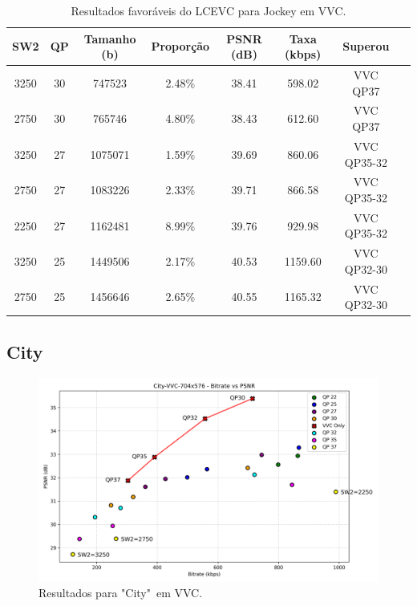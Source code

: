 \begin{table}[h]
    \centering
    \label{tab:jockey-vvc-lcevc}
    \begin{tabular}{|c|c|c|c|c|c|c|c|}
        \hline
        \textbf{SW2} & \textbf{QP} & \textbf{Tamanho (b)} & \textbf{Proporção} & \textbf{PSNR (dB)} & \textbf{Taxa (kbps)} & \textbf{Superou} \\
        \hline
        3250 & 30 & 747523 & 2.48\% & 38.41 & 598.02 & VVC QP37 \\
        2750 & 30 & 765746 & 4.80\% & 38.43 & 612.60 & VVC QP37 \\
        3250 & 27 & 1075071 & 1.59\% & 39.69 & 860.06 & VVC QP35-32 \\
        2750 & 27 & 1083226 & 2.33\% & 39.71 & 866.58 & VVC QP35-32 \\
        2250 & 27 & 1162481 & 8.99\% & 39.76 & 929.98 & VVC QP35-32 \\
        3250 & 25 & 1449506 & 2.17\% & 40.53 & 1159.60 & VVC QP32-30 \\
        2750 & 25 & 1456646 & 2.65\% & 40.55 & 1165.32 & VVC QP32-30 \\
        \hline
    \end{tabular}
    \caption{Resultados favoráveis do LCEVC para Jockey em VVC.}
\end{table}

\newpage
\subsection{City}

\begin{figure}[h]
    \centering
    \includegraphics[width=1.0\textwidth]{img/City-VVC.png}
    \caption{Resultados para "City"\ em \acrshort{VVC}. \cite{xiph}}
    \label{fig:City-VVC}
\end{figure}


